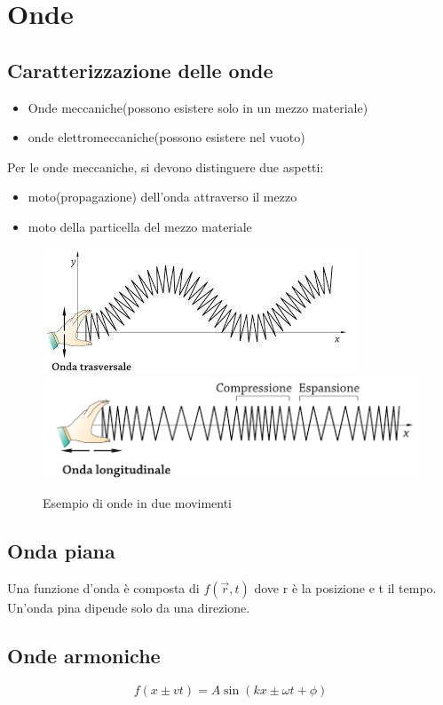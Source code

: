 \section{Onde}

\subsection{Caratterizzazione delle onde}
\begin{itemize}
    \item Onde meccaniche(possono esistere solo in un mezzo materiale)
    \item onde elettromeccaniche(possono esistere nel vuoto)
\end{itemize}

Per le onde meccaniche, si devono distinguere due aspetti:
\begin{itemize}
    \item moto(propagazione) dell'onda attraverso il mezzo
    \item moto della particella del mezzo materiale
\end{itemize}

\begin{figure}[H]
    \centering
    \includegraphics[width=0.45\linewidth]{imgs/22 - onda 2.png}
    \includegraphics[width=0.45\linewidth]{imgs/21 - onde.png}
    \label{fig:onda}
    \caption{Esempio di onde in due movimenti}
\end{figure}

\subsection{Onda piana}
Una funzione d'onda è composta di $f(\vec{r},t)$ dove r è la posizione
e t il tempo.
Un'onda pina dipende solo da una direzione.



\subsection{Onde armoniche}
\begin{equation}
    f(x \pm vt) = A\sin(kx \pm \omega t + \phi)
\end{equation}


